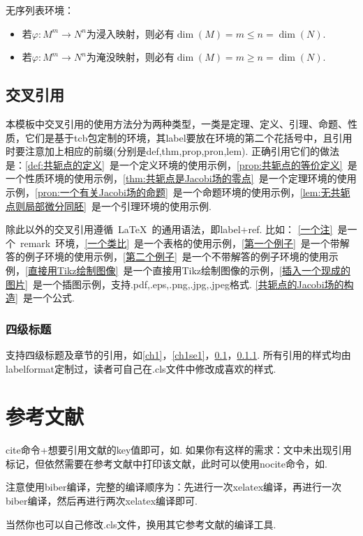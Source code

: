 无序列表环境：
\begin{itemize}
\item 若$\varphi : M ^ { m } \rightarrow N ^ { n }$为浸入映射，则必有$\operatorname{dim}(M)=m \leqslant n=\operatorname{dim}(N)$.
\item 若$\varphi : M ^ { m } \rightarrow N ^ { n }$为淹没映射，则必有$\operatorname{dim}(M)=m \geqslant n=\operatorname{dim}(N)$.
\end{itemize}

\subsection{交叉引用}\label{ch1subse1}

本模板中交叉引用的使用方法分为两种类型，一类是定理、定义、引理、命题、性质，它们是基于tcb包定制的环境，其label要放在环境的第二个花括号中，且引用时要注意加上相应的前缀(分别是def,thm,prop,pron,lem). 正确引用它们的做法是：\ref{def:共轭点的定义}~是一个定义环境的使用示例，\ref{prop:共轭点的等价定义}~是一个性质环境的使用示例，\ref{thm:共轭点是Jacobi场的零点}~是一个定理环境的使用示例，\ref{pron:一个有关Jacobi场的命题}~是一个命题环境的使用示例，\ref{lem:无共轭点则局部微分同胚}~是一个引理环境的使用示例.

除此以外的交叉引用遵循~\LaTeX~的通用语法，即label+ref. 比如： \ref{一个注}~是一个~remark~环境，\ref{一个类比}~是一个表格的使用示例，\ref{第一个例子}~是一个带解答的例子环境的使用示例，\ref{第二个例子}~是一个不带解答的例子环境的使用示例，\ref{直接用Tikz绘制图像}~是一个直接用Tikz绘制图像的示例，\ref{插入一个现成的图片}~是一个插图示例，支持.pdf,.eps,.png,.jpg,.jpeg格式. \ref{共轭点的Jacobi场的构造}~是一个公式.

\subsubsection{四级标题}\label{ch1subsubse1}

支持四级标题及章节的引用，如\ref{ch1}，\ref{ch1se1}，\ref{ch1subse1}，\ref{ch1subsubse1}. 所有引用的样式均由labelformat定制过，读者可自己在.cls文件中修改成喜欢的样式.

\section{参考文献}

cite命令+想要引用文献的key值即可，如\cite{EK85}. 如果你有这样的需求：文中未出现引用标记，但依然需要在参考文献中打印该文献，此时可以使用nocite命令，如\nocite{G03}.

注意使用biber编译，完整的编译顺序为：先进行一次xelatex编译，再进行一次biber编译，然后再进行两次xelatex编译即可.

当然你也可以自己修改.cls文件，换用其它参考文献的编译工具.